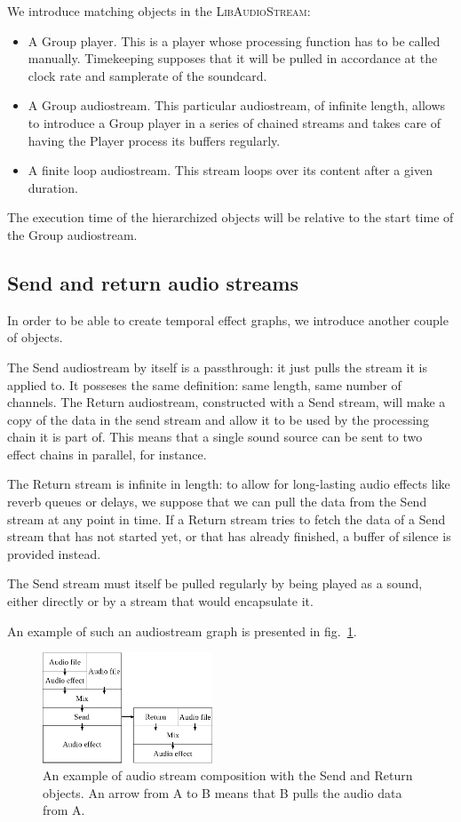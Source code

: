 \documentclass{article}
\newcommand*{\LibAudioStream}{\textsc{LibAudioStream}\xspace}
\begin{document}
We introduce matching objects in the \LibAudioStream: 
\begin{itemize}
	\item A Group player. This is a player whose processing function has to be called manually. 
	Timekeeping supposes that it will be pulled in accordance at the clock rate
	and samplerate of the soundcard.
	\item A Group audiostream. This particular audiostream, of infinite length, 
	allows to introduce a Group player in a series of chained streams and takes care of having the Player process its buffers
    regularly.
    \item A finite loop audiostream.
    This stream loops over its content after a given duration.
\end{itemize}

The execution time of the hierarchized objects will be relative to the start time of the Group audiostream.

\subsection{Send and return audio streams}
In order to be able to create temporal effect graphs, we introduce another couple of objects.

The Send audiostream by itself is a passthrough: it just pulls the stream it is applied to.
It posseses the same definition: same length, same number of channels.
The Return audiostream, constructed with a Send stream, will make a copy of the data in 
the send stream and allow it to be used by the processing chain it is part of.
This means that a single sound source can be sent to two effect chains in parallel, for instance.

The Return stream is infinite in length: to allow for long-lasting audio effects 
like reverb queues or delays, we suppose that we can pull the data from the Send stream at any point in time.
If a Return stream tries to fetch the data of a Send stream that has not started yet, or that has already finished, a buffer of silence is provided instead.

The Send stream must itself be pulled regularly by being played as a sound, either directly or by a stream that would encapsulate it.

An example of such an audiostream graph is presented in fig.~\ref{fig.mixsendreturn}.

\begin{figure}[h]
	\centering
	\includegraphics[width=0.45\textwidth]{figures/graph2.eps}
	\caption{An example of audio stream composition with the Send and Return objects. An arrow from A to B means that B pulls the audio data from A.}
	\label{fig.mixsendreturn}
\end{figure}
\end{document}
